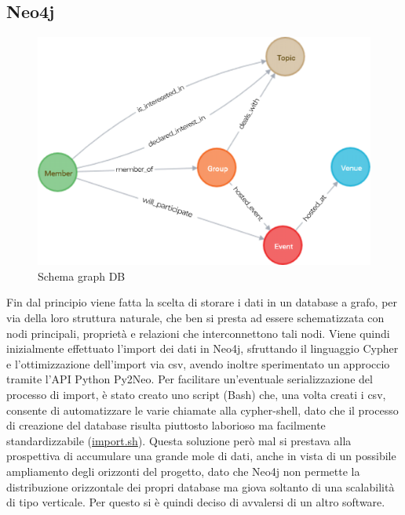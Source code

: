 \documentclass[fleqn,10pt]{SelfArx} %
\begin{document}
{\subsection{Neo4j}%
\begin{figure}
\centering
\includegraphics[scale=0.57]{graph.png}
\vspace*{0.01cm}
\caption{\footnotesize \label{graph_neo4j} Schema graph DB}
\end{figure}
Fin dal principio viene fatta la scelta di storare i dati in un database a grafo, per via della loro struttura naturale, che ben si presta ad essere schematizzata con nodi principali, proprietà e relazioni che interconnettono tali nodi. 
Viene quindi inizialmente effettuato l'import dei dati in Neo4j, sfruttando il linguaggio Cypher e l'ottimizzazione dell'import via csv, avendo inoltre sperimentato un approccio tramite l'API Python Py2Neo. 
Per facilitare un'eventuale serializzazione del processo di import, è stato creato uno script (Bash) che, una volta creati i csv, consente di automatizzare le varie chiamate alla cypher-shell, dato che il processo di creazione del database risulta piuttosto laborioso ma facilmente standardizzabile (\href{https://github.com/DBertazioli/NeoMeetup/blob/master/Scripts/import_cypher.sh}{import.sh}).
Questa soluzione però mal si prestava alla prospettiva di accumulare una grande mole di dati, anche in vista di un possibile ampliamento degli orizzonti del progetto, dato che Neo4j non permette la distribuzione orizzontale dei propri database ma giova soltanto di una scalabilità di tipo verticale. Per questo si è quindi deciso di avvalersi di un altro software.
}
\end{document}
